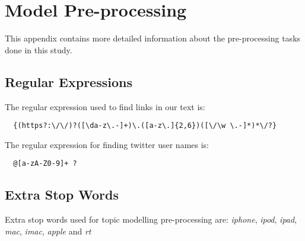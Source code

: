 \chapter{Model Pre-processing}
\label{cha:appx-model-preprocessing}
This appendix contains more detailed information about the pre-processing tasks done in this study.


\section{Regular Expressions}
\label{sec:appx-regular-expressions}
The regular expression used to find links in our text is:
\begin{verbatim}
  {(https?:\/\/)?([\da-z\.-]+)\.([a-z\.]{2,6})([\/\w \.-]*)*\/?}
\end{verbatim}

The regular expression for finding twitter user names is:
\begin{verbatim}
  @[a-zA-Z0-9]+ ?
\end{verbatim}

\section{Extra Stop Words}
\label{sec:appx-extra-stopwords}
Extra stop words used for topic modelling pre-processing are: \textit{iphone}, \textit{ipod},
\textit{ipad}, \textit{mac}, \textit{imac}, \textit{apple} and \textit{rt}


